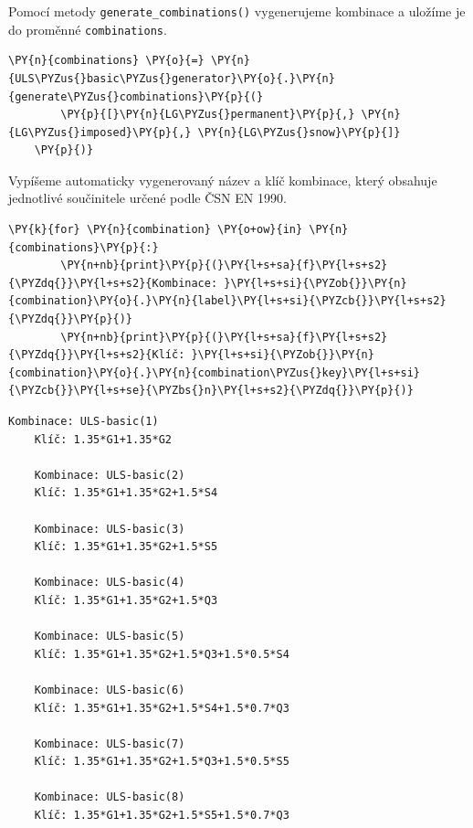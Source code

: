 Pomocí metody \texttt{generate\_combinations()} vygenerujeme kombinace a uložíme je do proměnné \texttt{combinations}.
        \begin{tcolorbox}[breakable, size=fbox, boxrule=1pt, pad at break*=1mm,colback=cellbackground, colframe=cellborder]
    \begin{Verbatim}[commandchars=\\\{\}]
    \PY{n}{combinations} \PY{o}{=} \PY{n}{ULS\PYZus{}basic\PYZus{}generator}\PY{o}{.}\PY{n}{generate\PYZus{}combinations}\PY{p}{(}
        \PY{p}{[}\PY{n}{LG\PYZus{}permanent}\PY{p}{,} \PY{n}{LG\PYZus{}imposed}\PY{p}{,} \PY{n}{LG\PYZus{}snow}\PY{p}{]}
    \PY{p}{)}
    \end{Verbatim}
    \end{tcolorbox}

Vypíšeme automaticky vygenerovaný název a klíč kombinace, který obsahuje jednotlivé součinitele určené podle ČSN EN 1990.
        \begin{tcolorbox}[breakable, size=fbox, boxrule=1pt, pad at break*=1mm,colback=cellbackground, colframe=cellborder]
    \begin{Verbatim}[commandchars=\\\{\}]
    \PY{k}{for} \PY{n}{combination} \PY{o+ow}{in} \PY{n}{combinations}\PY{p}{:}
        \PY{n+nb}{print}\PY{p}{(}\PY{l+s+sa}{f}\PY{l+s+s2}{\PYZdq{}}\PY{l+s+s2}{Kombinace: }\PY{l+s+si}{\PYZob{}}\PY{n}{combination}\PY{o}{.}\PY{n}{label}\PY{l+s+si}{\PYZcb{}}\PY{l+s+s2}{\PYZdq{}}\PY{p}{)}
        \PY{n+nb}{print}\PY{p}{(}\PY{l+s+sa}{f}\PY{l+s+s2}{\PYZdq{}}\PY{l+s+s2}{Klíč: }\PY{l+s+si}{\PYZob{}}\PY{n}{combination}\PY{o}{.}\PY{n}{combination\PYZus{}key}\PY{l+s+si}{\PYZcb{}}\PY{l+s+se}{\PYZbs{}n}\PY{l+s+s2}{\PYZdq{}}\PY{p}{)}
    \end{Verbatim}
    \end{tcolorbox}
    
        \begin{Verbatim}[commandchars=\\\{\}]
    Kombinace: ULS-basic(1)
    Klíč: 1.35*G1+1.35*G2
    
    Kombinace: ULS-basic(2)
    Klíč: 1.35*G1+1.35*G2+1.5*S4
    
    Kombinace: ULS-basic(3)
    Klíč: 1.35*G1+1.35*G2+1.5*S5
    
    Kombinace: ULS-basic(4)
    Klíč: 1.35*G1+1.35*G2+1.5*Q3
    
    Kombinace: ULS-basic(5)
    Klíč: 1.35*G1+1.35*G2+1.5*Q3+1.5*0.5*S4
    
    Kombinace: ULS-basic(6)
    Klíč: 1.35*G1+1.35*G2+1.5*S4+1.5*0.7*Q3
    
    Kombinace: ULS-basic(7)
    Klíč: 1.35*G1+1.35*G2+1.5*Q3+1.5*0.5*S5
    
    Kombinace: ULS-basic(8)
    Klíč: 1.35*G1+1.35*G2+1.5*S5+1.5*0.7*Q3
    
        \end{Verbatim}
    
